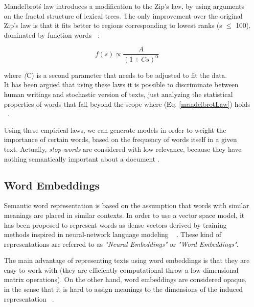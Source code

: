  Mandelbrot\'s law introduces a modification to the Zip's law, by using arguments on the fractal structure of lexical trees. The only improvement over the original Zip's law is that it fits better to regions corresponding to lowest ranks (s {$\le$} 100), dominated by function words ~\cite{montemurro2001beyond}: 

\begin{center}
\begin{equation}
\label{mandelbrotLaw}
f(s)  \propto  \frac{A}{(1+Cs)^{\alpha}} 
\end{equation}
\end{center}

where \textit(C) is a second parameter that needs to be adjusted to fit the data.\\

It has been argued that using these laws it is possible to discriminate between human writings and stochastic version of texts, just analyzing the statistical properties of words that fall beyond the scope where (Eq. \ref{mandelbrotLaw})  holds ~\cite{cohen1997numerical}.

Using these empirical laws, we can generate models in order to weight the importance of certain words, based on the frequency of words itself in a given text. Actually, \textit{stop-words} are considered with low relevance, because they have nothing semantically important about a document \cite{wilbur1992stopwords}.

%
\subsection{Word Embeddings}
%
Semantic word representation is based on the assumption that words with similar meanings are placed in similar contexts. 
In order to use a vector space model, it has been proposed  to represent words as dense vectors derived by training methods inspired in neural-network language modeling ~\cite{compositionality2013Mikolov}
. These kind of representations are referred to as \textit{"Neural Embeddings"} or \textit{"Word Embeddings"}. 

The main advantage of representing texts using word embeddings is that they are easy to work with (they are efficiently computational throw a low-dimensional matrix operations). On the other hand, word embeddings are considered opaque, in the sense that it is hard to assign meanings to the dimensions of the induced representation ~\cite{compositionality2013Mikolov}. 

